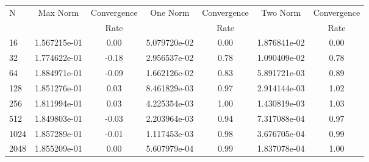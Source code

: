 \documentclass[12pt]{article}
\begin{document}
	\begin{tabular}{l|c|c|c|c|c|c}
		N&Max Norm&Convergence&One Norm&Convergence&Two Norm&Convergence\\
		&&Rate&&Rate&&Rate\\
		\hline
		16&1.567215e-01&0.00&5.079720e-02&0.00&1.876841e-02&0.00\\
		\hline
		32&1.774622e-01&-0.18&2.956537e-02&0.78&1.090409e-02&0.78\\
		\hline
		64&1.884971e-01&-0.09&1.662126e-02&0.83&5.891721e-03&0.89\\
		\hline
		128&1.851276e-01&0.03&8.461829e-03&0.97&2.914144e-03&1.02\\
		\hline
		256&1.811994e-01&0.03&4.225354e-03&1.00&1.430819e-03&1.03\\
		\hline
		512&1.849803e-01&-0.03&2.203964e-03&0.94&7.317088e-04&0.97\\
		\hline
		1024&1.857289e-01&-0.01&1.117453e-03&0.98&3.676705e-04&0.99\\
		\hline
		2048&1.855209e-01&0.00&5.607979e-04&0.99&1.837078e-04&1.00\\
	\end{tabular}
\end{document}
